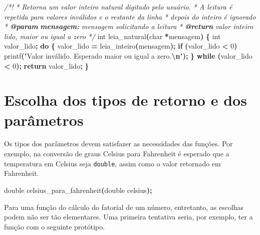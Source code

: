 \documentclass[
  11pt,
  a4paper,
]{scrbook}
\newenvironment{Shaded}{\begin{snugshade}}{\end{snugshade}}
\newcommand{\AnnotationTok}[1]{\textcolor[rgb]{0.56,0.35,0.01}{\textbf{\textit{#1}}}}
\newcommand{\CommentTok}[1]{\textcolor[rgb]{0.56,0.35,0.01}{\textit{#1}}}
\newcommand{\CommentVarTok}[1]{\textcolor[rgb]{0.56,0.35,0.01}{\textbf{\textit{#1}}}}
\newcommand{\ControlFlowTok}[1]{\textcolor[rgb]{0.13,0.29,0.53}{\textbf{#1}}}
\newcommand{\DataTypeTok}[1]{\textcolor[rgb]{0.13,0.29,0.53}{#1}}
\newcommand{\DecValTok}[1]{\textcolor[rgb]{0.00,0.00,0.81}{#1}}
\newcommand{\NormalTok}[1]{#1}
\newcommand{\OperatorTok}[1]{\textcolor[rgb]{0.81,0.36,0.00}{\textbf{#1}}}
\newcommand{\SpecialCharTok}[1]{\textcolor[rgb]{0.81,0.36,0.00}{\textbf{#1}}}
\newcommand{\StringTok}[1]{\textcolor[rgb]{0.31,0.60,0.02}{#1}}
\begin{document}
\begin{Shaded}
\begin{Highlighting}[]
\CommentTok{/*!}
\CommentTok{ * Retorna um valor inteiro natural digitado pelo usuário.}
\CommentTok{ * A leitura é repetida para valores inválidos e o restante da linha}
\CommentTok{ * depois do inteiro é ignorado}
\CommentTok{ * }\AnnotationTok{@param}\CommentTok{ }\CommentVarTok{mensagem:}\CommentTok{ mensagem solicitando a leitura}
\CommentTok{ * }\AnnotationTok{@return}\CommentTok{ valor inteiro lido, maior ou igual a zero}
\CommentTok{ */}
\DataTypeTok{int}\NormalTok{ leia\_natural}\OperatorTok{(}\DataTypeTok{char} \OperatorTok{*}\NormalTok{mensagem}\OperatorTok{)} \OperatorTok{\{}
    \DataTypeTok{int}\NormalTok{ valor\_lido}\OperatorTok{;}
    \ControlFlowTok{do} \OperatorTok{\{}
\NormalTok{        valor\_lido }\OperatorTok{=}\NormalTok{ leia\_inteiro}\OperatorTok{(}\NormalTok{mensagem}\OperatorTok{);}
        \ControlFlowTok{if} \OperatorTok{(}\NormalTok{valor\_lido }\OperatorTok{\textless{}} \DecValTok{0}\OperatorTok{)}
\NormalTok{            printf}\OperatorTok{(}\StringTok{"Valor inválido. Esperado maior ou igual a zero.}\SpecialCharTok{\textbackslash{}n}\StringTok{"}\OperatorTok{);}
    \OperatorTok{\}} \ControlFlowTok{while} \OperatorTok{(}\NormalTok{valor\_lido }\OperatorTok{\textless{}} \DecValTok{0}\OperatorTok{);}
    \ControlFlowTok{return}\NormalTok{ valor\_lido}\OperatorTok{;}
\OperatorTok{\}}
\end{Highlighting}
\end{Shaded}

\section{Escolha dos tipos de retorno e dos
parâmetros}\label{escolha-dos-tipos-de-retorno-e-dos-paruxe2metros}

Os tipos dos parâmetros devem satisfazer as necessidades das funções.
Por exemplo, na conversão de graus Celsius para Fahrenheit é esperado
que a temperatura em Celsius seja \texttt{double}, assim como o valor
retornado em Fahrenheit.

\begin{Shaded}
\begin{Highlighting}[]
\DataTypeTok{double}\NormalTok{ celsius\_para\_fahrenheit}\OperatorTok{(}\DataTypeTok{double}\NormalTok{ celsius}\OperatorTok{);}
\end{Highlighting}
\end{Shaded}

Para uma função do cálculo do fatorial de um número, entretanto, as
escolhas podem não ser tão elementares. Uma primeira tentativa seria,
por exemplo, ter a função com o seguinte protótipo.
\end{document}
